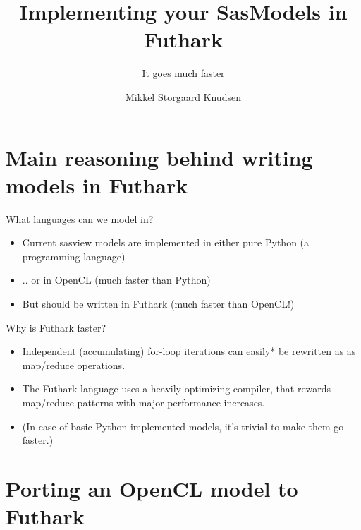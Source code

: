 \documentclass[10pt]{beamer}
\title{Implementing your  SasModels in Futhark}
\subtitle{It goes much faster}
\date{}
\author{Mikkel Storgaard Knudsen}
\begin{document}
\maketitle

\section{Main reasoning behind writing models in Futhark}
\begin{frame}[fragile]{What languages can we model in?}
  \begin{itemize}
  \item Current sasview models are implemented in either pure Python (a programming language)
  \item .. or in OpenCL (much faster than Python)
  \item But should be written in Futhark (much faster than OpenCL!)
  \end{itemize}
\end{frame}
\begin{frame}[fragile]{Why is Futhark faster?}
  \begin{itemize}
  \item Independent (accumulating) for-loop iterations can easily* be rewritten as
    as map/reduce operations.

  \item The Futhark language uses a heavily optimizing compiler, that rewards
    map/reduce patterns with major performance increases.

  \item (In case of basic Python implemented models, it's trivial to make them go
    faster.)
  \end{itemize}
\end{frame}

\section{Porting an OpenCL model to Futhark}
\end{document}
